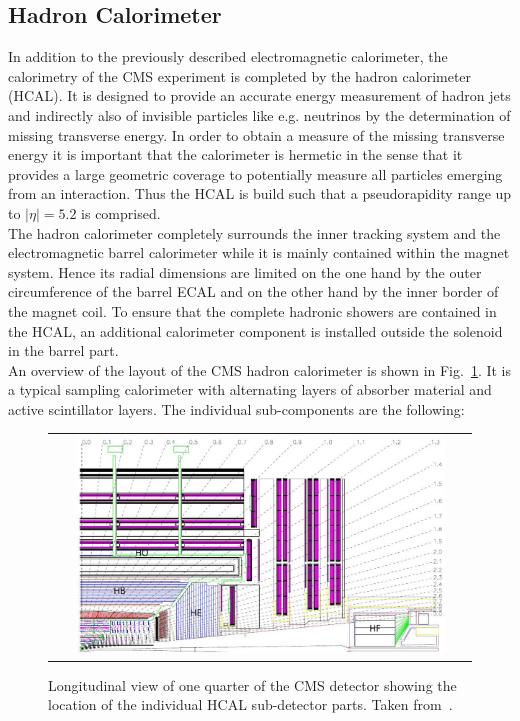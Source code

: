 \subsection{Hadron Calorimeter}
\label{subsec:cms_hcal}
In addition to the previously described electromagnetic calorimeter, the calorimetry of the CMS experiment is completed by the hadron calorimeter (HCAL). It is designed to provide an accurate energy measurement of hadron jets and indirectly also of invisible particles like e.g. neutrinos by the determination of missing transverse energy. In order to obtain a measure of the missing transverse energy it is important that the calorimeter is hermetic in the sense that it provides a large geometric coverage to potentially measure all particles emerging from an interaction. Thus the HCAL is build such that a pseudorapidity range up to $|\eta| = 5.2$ is comprised. \\ 
The hadron calorimeter completely surrounds the inner tracking system and the electromagnetic barrel calorimeter while it is mainly contained within the magnet system. Hence its radial dimensions are limited on the one hand by the outer circumference of the barrel ECAL and on the other hand by the inner border of the magnet coil. To ensure that the complete hadronic showers are contained in the HCAL, an additional calorimeter component is installed outside the solenoid in the barrel part. \\
An overview of the layout of the CMS hadron calorimeter is shown in Fig.~\ref{fig:CMS_hcal}. It is a typical sampling calorimeter with alternating layers of absorber material and active scintillator layers. The individual sub-components are the following:
\begin{figure}[!tp]
  \centering
  \begin{tabular}{c}
    \includegraphics[width=0.9\textwidth]{figures/Figures_Experimental_Apparatus_HCAL.png}
  \end{tabular}
  \caption{Longitudinal view of one quarter of the CMS detector showing the location of the individual HCAL sub-detector parts. Taken from~\cite{Chatrchyan:2008zzk}.}
  \label{fig:CMS_hcal}
\end{figure}
